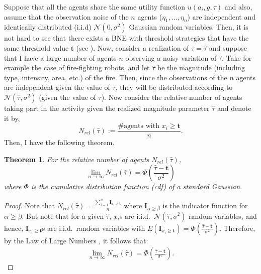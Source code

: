 \documentclass[defaultstyle,12pt]{proposal}
\newtheorem{theorem}{Theorem}
\def\td{\mathbf{t}}   %
\begin{document}
Suppose that all the agents share the same utility function $u(a_i,g,\tau)$ and also, assume that the observation noise of the $n$ agents ($\eta_1,\ldots,\eta_n$) are independent and identically distributed (i.i.d) $\mathcal{N}(0,\sigma^2)$ Gaussian random variables. Then, it is not hard to see that there exists a BNE with threshold strategies that have the same threshold value $\td$ (see  \cite{Morris2000}). Now, consider a realization of $\tau=\hat{\tau}$ and suppose that I have a large number of agents $n$ observing a noisy variation of $\hat{\tau}$. Take for example the case of fire-fighting robots, and let $\hat{\tau}$ be the magnitude (including type, intensity, area, etc.) of the fire. Then, since the observations of the $n$ agents are independent given the value of $\tau$, they will be distributed according to $\mathcal{N}(\hat{\tau},\sigma^2)$ (given the value of $\tau$). Now consider the relative number of agents taking part in the activity given the realized magnitude parameter $\hat{\tau}$ and denote it by,
\begin{equation}\label{eqn:Nrel}
	N_{rel}(\hat{\tau}):=\frac{\#\text{agents with }x_i\geq \td}{n}.
\end{equation}
Then, I have the following theorem.

\begin{theorem}\label{thrm:relativefrequency}
For the relative number of agents $N_{rel}(\hat{\tau})$,
\begin{equation}
\lim_{n\to\infty}N_{rel}(\hat{\tau})=\Phi(\frac{\hat{\tau}-\td}{\sigma^2})
\end{equation}
where $\Phi$ is the cumulative distribution function (cdf) of a standard Gaussian. 
\end{theorem}
\begin{proof}
Note that $N_{rel}(\hat{\tau})=\frac{\sum_{i=1}^n\mathbf{I}_{x_i\geq \td}}{n}$ where $\mathbf{I}_{\alpha\geq \beta}$ is the indicator function for $\alpha\geq \beta$. But note that for a given $\hat{\tau}$, $x_i$s are i.i.d.\ $\mathcal{N}(\hat{\tau},\sigma^2)$ random variables, and hence, $\mathbf{I}_{x_i\geq \td}$s are i.i.d.\ random variables with $E(\mathbf{I}_{x_i\geq \td})=\Phi(\frac{\hat{\tau}-\td}{\sigma^2})$. Therefore, by the Law of Large Numbers \cite{durrett2010}, it follows that:
\vspace{-5px}
\begin{align*}
\lim_{n\to\infty}N_{rel}(\hat{\tau})=\Phi(\frac{\hat{\tau}-\td}{\sigma^2}).
\end{align*}
\vspace{-5px}
\end{proof}
\end{document}
